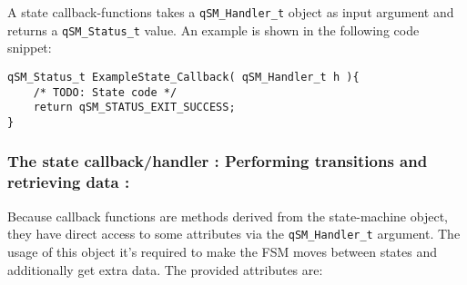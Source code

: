 A state callback-functions takes a \lstinline{qSM_Handler_t} object as input argument and returns a \lstinline{qSM_Status_t} value. An example is shown in the following code snippet:
\medskip

\begin{lstlisting}[style=CStyle]
qSM_Status_t ExampleState_Callback( qSM_Handler_t h ){
    /* TODO: State code */
    return qSM_STATUS_EXIT_SUCCESS;
}
\end{lstlisting} 


\subsubsection{The state callback/handler : Performing transitions and retrieving data : }

Because callback functions are methods derived from the state-machine object, they have direct access to some attributes via the \lstinline{qSM_Handler_t} argument. 
The usage of this object it's required to make the FSM moves between states and additionally get extra data. The provided attributes are:

